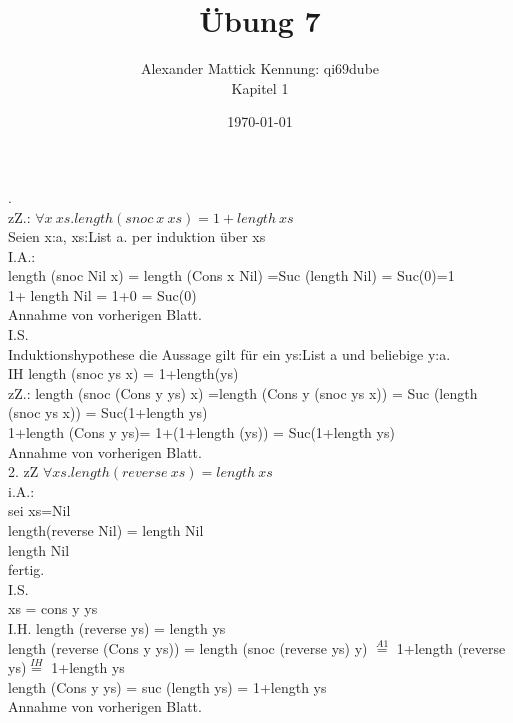 \documentclass{article}
\author{
Alexander Mattick Kennung: qi69dube\\
Kapitel 1
}
\date{\today}
\title{Übung 7}
\begin{document}
	.\\
	zZ.: $\forall x\ xs. length(snoc\ x\ xs) = 1+length\ xs$\\
	Seien x:a, xs:List a. per induktion über xs\\
	I.A.:\\
	length (snoc Nil x) = length (Cons x Nil) =Suc (length Nil) = Suc(0)=1 \\
	1+ length Nil = 1+0 = Suc(0)\\
	Annahme von vorherigen Blatt.\\
	I.S.\\
	Induktionshypothese die Aussage gilt für ein ys:List a und beliebige y:a.\\
	IH length (snoc ys x) = 1+length(ys)\\
	zZ.: length (snoc (Cons y ys) x) =length (Cons y (snoc ys x)) = Suc (length (snoc ys x)) = Suc(1+length ys)\\
	1+length (Cons y ys)= 1+(1+length (ys)) = Suc(1+length ys)\\
	Annahme von vorherigen Blatt.\\
	2. zZ $\forall xs. length (reverse\ xs) = length\ xs$\\
	i.A.:\\
	sei xs=Nil\\
	length(reverse Nil) = length Nil\\
	length Nil\\
	fertig.\\
	I.S.\\
	xs = cons y ys\\
	I.H. length (reverse ys) = length ys\\
	length (reverse (Cons y ys)) = length (snoc (reverse ys) y) $\stackrel{A1}{=}$ 1+length (reverse ys)$\stackrel{IH}{=}$ 1+length ys\\
	length (Cons y ys) = suc (length ys) = 1+length ys\\
	Annahme von vorherigen Blatt.\\
	
\end{document}
